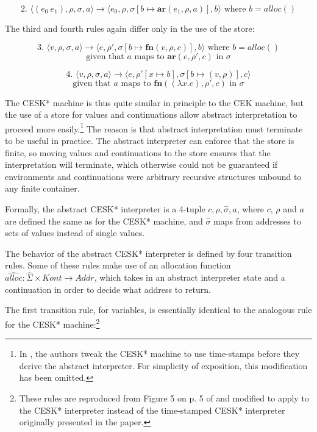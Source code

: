 \documentclass{article}
\begin{document}
$$
\text{2. }
\langle (e_0\ e_1), \rho, \sigma, a \rangle
\to
\langle e_0, \rho, \sigma[b \mapsto \textbf{ar}(e_1, \rho, a)], b \rangle
\text{ where $b = alloc()$}
$$

The third and fourth rules again differ only in the use of the store:

$$
\text{3. }
\langle v, \rho, \sigma, a \rangle
\to
\langle e, \rho', \sigma[b \mapsto \textbf{fn}(v, \rho, c)], b \rangle
\text{ where $b = alloc()$}
$$
$$
\text{given that $a$ maps to $\textbf{ar}(e, \rho', c)$ in $\sigma$}
$$

$$
\text{4. }
\langle v, \rho, \sigma, a \rangle
\to
\langle e, \rho'[x \mapsto b], \sigma[b \mapsto (v, \rho)], c \rangle
$$
$$
\text{given that $a$ maps to $\textbf{fn}((\lambda x.e), \rho', c)$ in $\sigma$}
$$

The CESK* machine is thus quite similar in principle to the CEK machine, but the use of a store for values and continuations allow abstract interpretation to proceed more easily.\footnote{In \cite{aam}, the authors tweak the CESK* machine to use time-stamps before they derive the abstract interpreter. For simplicity of exposition, this modification has been omitted.} The reason is that abstract interpretation must terminate to be useful in practice. The abstract interpreter can enforce that the store is finite, so moving values and continuations to the store ensures that the interpretation will terminate, which otherwise could not be guaranteed if environments and continuations were arbitrary recursive structures unbound to any finite container.

Formally, the abstract CESK* interpreter is a 4-tuple $c, \rho, \hat{\sigma}, a$, where $c$, $\rho$ and $a$ are defined the same as for the CESK* machine, and $\hat{\sigma}$ maps from addresses to sets of values instead of single values.

The behavior of the abstract CESK* interpreter is defined by four transition rules. Some of these rules make use of an allocation function $\widehat{alloc} : \hat{\Sigma} \times Kont \to Addr$, which takes in an abstract interpreter state and a continuation in order to decide what address to return.

The first transition rule, for variables, is essentially identical to the analogous rule for the CESK* machine:\footnote{These rules are reproduced from Figure 5 on p. 5 of \cite{aam} and modified to apply to the CESK* interpreter instead of the time-stamped CESK* interpreter originally presented in the paper.}
\end{document}
